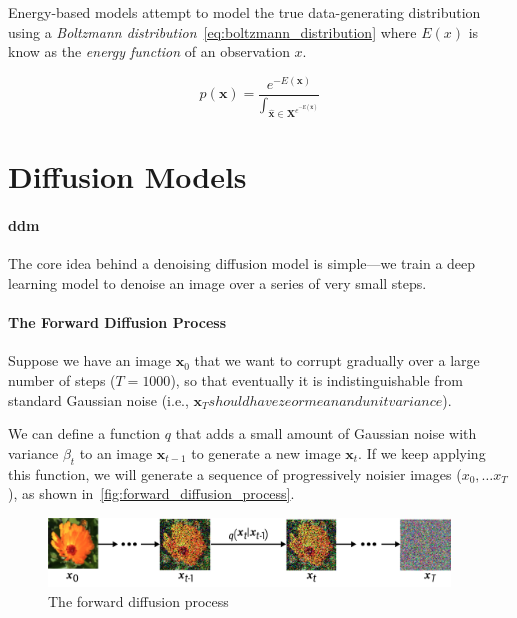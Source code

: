 Energy-based models attempt to model the true data-generating distribution using a \emph{Boltzmann distribution}~\eqref{eq:boltzmann_distribution} where \( E\left( x\right)\) is know as the \emph{energy function} of an observation \( x\).

\begin{equation}
	p\left(\mathbf{x}\right) = \frac{e^{-E(\mathbf{x})} }{\int_{\mathbf{\hat{x}} \in \mathbf{X}^{e^{-E(\mathbf{\hat{x}})}}}}
	\label{eq:boltzmann_distribution}
\end{equation}

\section{Diffusion Models}

\paragraph{\gls{ddm}}

The core idea behind a denoising diffusion model is simple—we train a deep learning model to denoise an image over a series of very small steps.


\paragraph{The Forward Diffusion Process}

Suppose we have an image \( \mathbf{x}_{0} \) that we want to corrupt gradually over a large number of steps (\( T= 1000\)), so that eventually it is indistinguishable from standard Gaussian noise (i.e., \( \mathbf{x}_{T} should have zeor mean and unit variance\)). 


We can define a function \( q \) that adds a small amount of Gaussian noise with variance \( \beta_{t} \) to an image \( \mathbf{x}_{t-1} \) to generate a new image \( \mathbf{x}_t \). 
If we keep applying this function, we will generate a sequence of progressively noisier images (\( x_{0}, \ldots x_{T} \)), as shown in~\autoref{fig:forward_diffusion_process}.

\begin{figure}
    \begin{center}
        \includegraphics[width=0.95\textwidth]{figures/forward_diffusion_process}
    \end{center}
    \caption{The forward diffusion process}\label{fig:forward_diffusion_process}
\end{figure}


